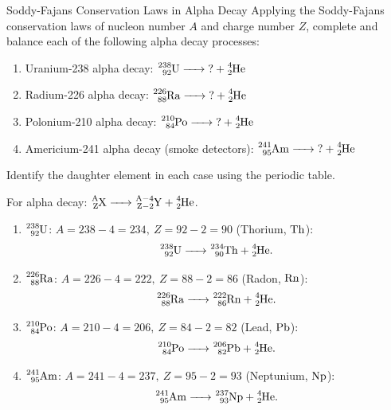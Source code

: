 \begin{exercise}{Soddy-Fajans Conservation Laws in Alpha Decay}
Applying the Soddy-Fajans conservation laws of nucleon number $A$ and charge number $Z$, complete and balance each of the following alpha decay processes:
\begin{enumerate}[leftmargin=1.5em,itemsep=2pt]
  \item Uranium-238 alpha decay: $\ce{^{238}_{92}U ->} \mathbf{?} + \ce{^{4}_{2}He}$
  \item Radium-226 alpha decay: $\ce{^{226}_{88}Ra ->} \mathbf{?} + \ce{^{4}_{2}He}$
  \item Polonium-210 alpha decay: $\ce{^{210}_{84}Po ->} \mathbf{?} + \ce{^{4}_{2}He}$
  \item Americium-241 alpha decay (smoke detectors): $\ce{^{241}_{95}Am ->} \mathbf{?} + \ce{^{4}_{2}He}$
\end{enumerate}
Identify the daughter element in each case using the periodic table.
\end{exercise}

\begin{tabletworkspace}[5.0cm]
\end{tabletworkspace}

\begin{solution}
For alpha decay: $\ce{^{A}_{Z}X -> ^{A-4}_{Z-2}Y + ^{4}_{2}He}$.
\begin{enumerate}[leftmargin=1.5em,itemsep=3pt]
  \item $\ce{^{238}_{92}U}$:
  $A = 238 - 4 = 234,\ Z = 92 - 2 = 90$ (Thorium, $\ce{Th}$):
  \[
  \ce{^{238}_{92}U -> ^{234}_{90}Th + ^{4}_{2}He}.
  \]
  \item $\ce{^{226}_{88}Ra}$:
  $A = 226 - 4 = 222,\ Z = 88 - 2 = 86$ (Radon, $\ce{Rn}$):
  \[
  \ce{^{226}_{88}Ra -> ^{222}_{86}Rn + ^{4}_{2}He}.
  \]
  \item $\ce{^{210}_{84}Po}$:
  $A = 210 - 4 = 206,\ Z = 84 - 2 = 82$ (Lead, $\ce{Pb}$):
  \[
  \ce{^{210}_{84}Po -> ^{206}_{82}Pb + ^{4}_{2}He}.
  \]
  \item $\ce{^{241}_{95}Am}$:
  $A = 241 - 4 = 237,\ Z = 95 - 2 = 93$ (Neptunium, $\ce{Np}$):
  \[
  \ce{^{241}_{95}Am -> ^{237}_{93}Np + ^{4}_{2}He}.
  \]
\end{enumerate}
\end{solution}

